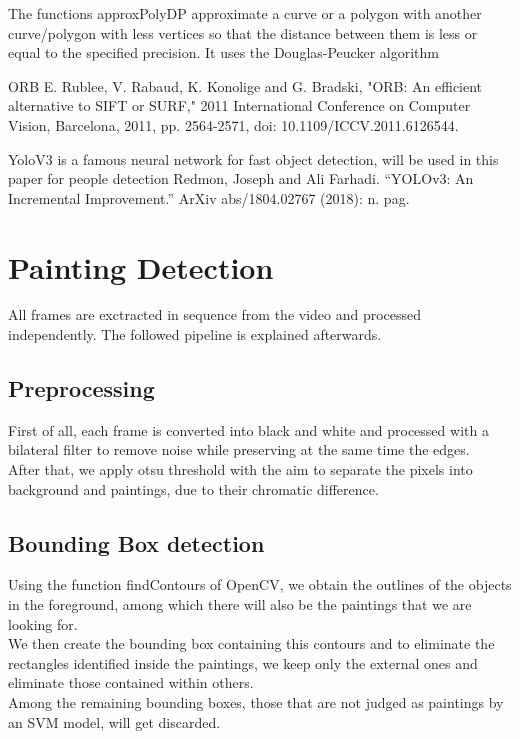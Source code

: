 \documentclass[conference]{IEEEtran}
\begin{document}
The functions approxPolyDP approximate a curve or a polygon with another curve/polygon with less vertices so that the distance between them is less or equal to the specified precision. It uses the Douglas-Peucker algorithm 

ORB E. Rublee, V. Rabaud, K. Konolige and G. Bradski, "ORB: An efficient alternative to SIFT or SURF," 2011 International Conference on Computer Vision, Barcelona, 2011, pp. 2564-2571, doi: 10.1109/ICCV.2011.6126544.

YoloV3 is a famous neural network for fast object detection, will be used in this paper for people detection
Redmon, Joseph and Ali Farhadi. “YOLOv3: An Incremental Improvement.” ArXiv abs/1804.02767 (2018): n. pag.

\section{Painting Detection}
All frames are exctracted in sequence from the video and processed independently. The followed pipeline is explained afterwards.

\subsection{Preprocessing}
First of all, each frame is converted into black and white and processed with a bilateral filter to remove noise while preserving at the same time the edges.\\
After that, we apply otsu threshold  with the aim to separate the pixels into background and paintings, due to their chromatic difference.

\subsection{Bounding Box detection}
Using the function findContours of OpenCV, we obtain the outlines of the objects in the foreground, among which there will also be the paintings that we are looking for.\\
We then create the bounding box containing this contours and to eliminate the rectangles identified inside the paintings, we keep only the external ones and eliminate those contained within others.\\
Among the remaining bounding boxes, those that are not judged as paintings by an SVM model, will get discarded.
\end{document}
